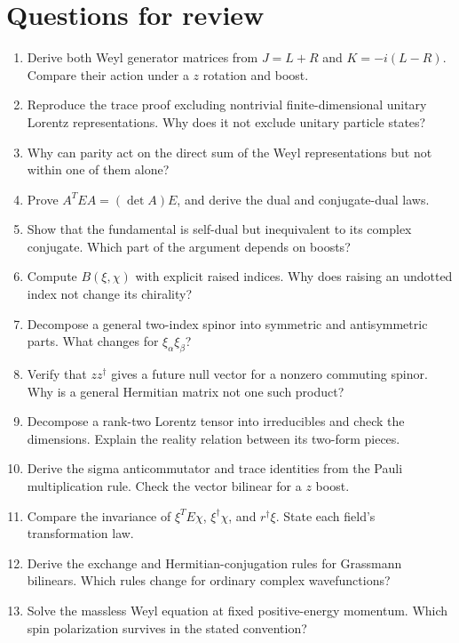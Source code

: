 \documentclass[11pt]{article}
\begin{document}
\section*{Questions for review}
\begin{enumerate}
\item Derive both Weyl generator matrices from \(J=L+R\) and
\(K=-i(L-R)\). Compare their action under a \(z\) rotation and boost.
\item Reproduce the trace proof excluding nontrivial finite-dimensional
unitary Lorentz representations. Why does it not exclude unitary particle states?
\item Why can parity act on the direct sum of the Weyl representations
but not within one of them alone?
\item Prove \(A^T E A=(\det A)E\), and derive the dual and conjugate-dual laws.
\item Show that the fundamental is self-dual but inequivalent to its
complex conjugate. Which part of the argument depends on boosts?
\item Compute \(B(\xi,\chi)\) with explicit raised indices.
Why does raising an undotted index not change its chirality?
\item Decompose a general two-index spinor into symmetric and
antisymmetric parts. What changes for \(\xi_\alpha\xi_\beta\)?
\item Verify that \(zz^\dagger\) gives a future null vector for a nonzero
commuting spinor. Why is a general Hermitian matrix not one such product?
\item Decompose a rank-two Lorentz tensor into irreducibles and check
the dimensions. Explain the reality relation between its two-form pieces.
\item Derive the sigma anticommutator and trace identities from the
Pauli multiplication rule. Check the vector bilinear for a \(z\) boost.
\item Compare the invariance of \(\xi^T E\chi\), \(\xi^\dagger\chi\),
and \(r^\dagger\xi\). State each field's transformation law.
\item Derive the exchange and Hermitian-conjugation rules for Grassmann
bilinears. Which rules change for ordinary complex wavefunctions?
\item Solve the massless Weyl equation at fixed positive-energy momentum.
Which spin polarization survives in the stated convention?
\end{enumerate}
\end{document}
